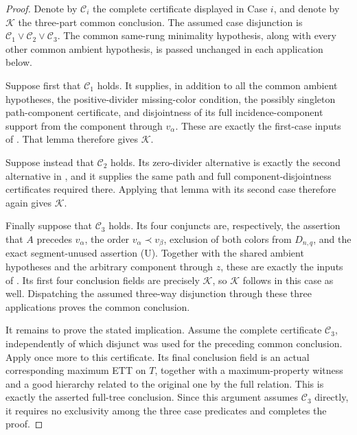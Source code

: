 \begin{proof}
Denote by $\mathcal C_i$ the complete certificate displayed in Case
$i$, and denote by $\mathcal K$ the three-part common conclusion.
The assumed case disjunction is
$\mathcal C_1\vee\mathcal C_2\vee\mathcal C_3$.
The common same-rung minimality hypothesis, along with every other common
ambient hypothesis, is passed unchanged in each application below.

Suppose first that $\mathcal C_1$ holds.  It supplies, in addition to all
the common ambient hypotheses, the positive-divider missing-color
condition, the possibly singleton path-component certificate, and
disjointness of its full incidence-component support from the component
through $v_\alpha$.  These are exactly the first-case inputs of
.  That lemma therefore gives
$\mathcal K$.

Suppose instead that $\mathcal C_2$ holds.  Its zero-divider alternative
is exactly the second alternative in
, and it supplies the same path and full
component-disjointness certificates required there.  Applying that lemma
with its second case therefore again gives $\mathcal K$.

Finally suppose that $\mathcal C_3$ holds.  Its four conjuncts are,
respectively, the assertion that $A$ precedes $v_\alpha$, the order
$v_\alpha\prec v_\beta$, exclusion of both colors from $D_{n,q}$, and
the exact segment-unused assertion (U).  Together with the shared
ambient hypotheses and the arbitrary component through $z$, these are
exactly the inputs of .  Its first four
conclusion fields are precisely $\mathcal K$, so $\mathcal K$ follows in
this case as well.  Dispatching the assumed three-way disjunction through
these three applications proves the common conclusion.

It remains to prove the stated implication.  Assume the complete
certificate $\mathcal C_3$, independently of which disjunct was used for
the preceding common conclusion.  Apply
 once more to this certificate.  Its final
conclusion field is an actual corresponding maximum ETT on $T$, together
with a maximum-property witness and a good hierarchy related to the
original one by the full  relation.  This is
exactly the asserted full-tree conclusion.  Since this argument assumes
$\mathcal C_3$ directly, it requires no exclusivity among the three case
predicates and completes the proof.
\end{proof}

